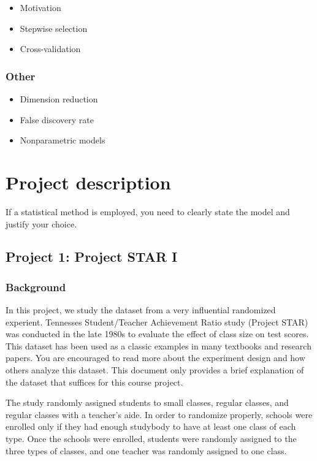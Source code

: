 \documentclass[12pt,]{book}
\providecommand{\tightlist}{%
  \setlength{\itemsep}{0pt}\setlength{\parskip}{0pt}}
\begin{document}
\begin{itemize}
\tightlist
\item
  Motivation
\item
  Stepwise selection
\item
  Cross-validation
\end{itemize}

\subsection{Other}\label{other}

\begin{itemize}
\tightlist
\item
  Dimension reduction
\item
  False discovery rate
\item
  Nonparametric models
\end{itemize}

\chapter{Project description}\label{ch:proj}

If a statistical method is employed, you need to clearly state the model
and justify your choice.

\section{Project 1: Project STAR I}\label{project-1-project-star-i}

\subsection{Background}\label{background}

In this project, we study the dataset from a very influential randomized
experient. Tennesses Student/Teacher Achievement Ratio study (Project
STAR) was conducted in the late 1980s to evaluate the effect of class
size on test scores. This dataset has been used as a classic examples in
many textbooks and research papers. You are encouraged to read more
about the experiment design and how others analyze this dataset. This
document only provides a brief explanation of the dataset that suffices
for this course project.

The study randomly assigned students to small classes, regular classes,
and regular classes with a teacher's aide. In order to randomize
properly, schools were enrolled only if they had enough studybody to
have at least one class of each type. Once the schools were enrolled,
students were randomly assigned to the three types of classes, and one
teacher was randomly assigned to one class.
\end{document}
